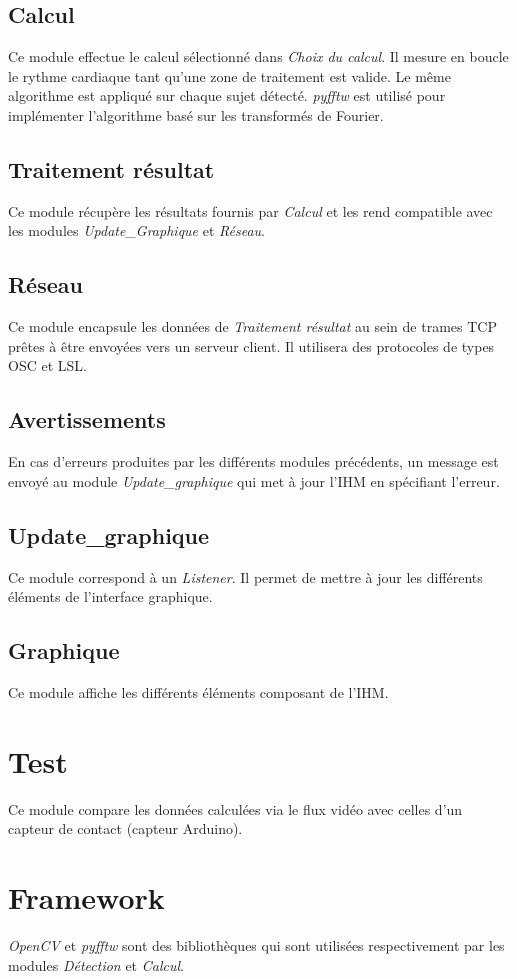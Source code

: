 \documentclass[12pt,a4paper]{article}
\begin{document}
\vspace*{-1.01in}

\subsection*{Calcul}

Ce module effectue le calcul sélectionné dans \textit{Choix du calcul}. Il mesure en boucle le rythme cardiaque tant qu'une zone de traitement est valide.
Le même algorithme est appliqué sur chaque sujet détecté.\newline
\textit{pyfftw} est utilisé pour implémenter l'algorithme basé sur les transformés de Fourier.

\subsection*{Traitement résultat}
Ce module récupère les résultats fournis par \textit{Calcul} et les rend compatible avec les modules \textit{Update\_Graphique} et \textit{Réseau}.

\subsection*{Réseau}
Ce module encapsule les données de \textit{Traitement résultat} au sein de trames TCP prêtes à être envoyées vers un serveur client.
Il utilisera des protocoles de types OSC et LSL.

\subsection*{Avertissements}
En cas d'erreurs produites par les différents modules précédents, un message est envoyé au module \textit{Update\_graphique} qui met à jour l'IHM en spécifiant l'erreur.

\subsection*{Update\_graphique}
Ce module correspond à un \textit{Listener}. Il permet de mettre à jour les différents éléments de l'interface graphique.

\subsection*{Graphique}
Ce module affiche les différents éléments composant de l'IHM.
\newpage
\section*{Test}
Ce module compare les données calculées via le flux vidéo avec celles d'un capteur de contact (capteur Arduino).

\section*{Framework}
\textit{OpenCV} et \textit{pyfftw} sont des bibliothèques qui sont utilisées respectivement par les modules \textit{Détection} et \textit{Calcul}.
\end{document}
